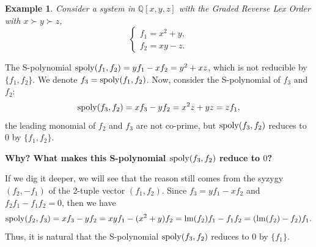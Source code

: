 \documentclass[preprint,authoryear,3p,12pt]{elsarticle}
\newtheorem{example}[theorem]{Example}
\def\lm{{\rm lm}}
\def\lpp{{\rm lpp}}
\def\sp{{\rm spoly}}
\def\Q{{\mathbb{Q}}}
\newcommand{\ignore}[1]{}
\begin{document}
\ignore{
\begin{example} \label{exa-buchbergersyzygy}
Consider a system in $\Q[x, y]$ with the Graded Reverse Lex Order with $x\succ y$:
$$\left\{\begin{array}{l} f_1=x^2-y, \\
f_2=y^2-x.
\end{array}\right. $$
\end{example}
The S-polynomial $\sp(f_1, f_2)=y^2f_1-x^2f_2$ is not necessary to
reduce according to the Buchberger's criterion \citep{Buchberger79},
since the leading power products $\lpp(f_1)=x^2$ and $\lpp(f_2)=y^2$
are co-prime.

However, this fact can also be explained in a slightly different way. For  a   2-tuple vector $(f_1, f_2)$ in $\Q[x, y]^2$, there
exists a trivial syzygy $(f_2, -f_1)$, i.e.   $f_2f_1-f_1f_2=0$  or
$$\lm(f_2)f_1-\lm(f_1)f_2=(\lm(f_2)-f_2)f_1-(\lm(f_1)-f_1)f_2,$$ specifically,
$$\sp(f_1, f_2)=y^2f_1-x^2f_2=xf_1-yf_2,$$ which indicates the S-polynomial
$\sp(f_1, f_2)$ reduces to $0$ by $\{f_1, f_2\}$. The highlight of this explanation is that {\it it is the syzygy of $(f_1, f_2)$
that leads to   $\sp(f_1, f_2)$ reducing to $0$.}

In fact, the syzygy of $(f_1, f_2)$ can also result in some S-polynomials reducing to $0$ even if $\lpp(f_1)$ and $\lpp(f_2)$ are
not co-prime.

Now, let's take a look on the following example:}
\begin{example} \label{exa-syzygy}
Consider a system in $\Q[x, y, z]$ with the Graded Reverse Lex Order with $x\succ y\succ z$,
$$\left\{\begin{array}{l} f_1=x^2+y, \\
f_2=xy-z.
\end{array}\right. $$
\end{example}

The S-polynomial $\sp(f_1, f_2)=yf_1-xf_2=y^2+xz$, which is not reducible by $\{f_1, f_2\}$. We denote $f_3=\sp(f_1, f_2) $. Now,
consider the S-polynomial of $f_3$ and $f_2$: $$\sp(f_3, f_2)=xf_3-yf_2=x^2z+yz=zf_1,$$ the leading monomial of $f_2$ and $f_3$
are not co-prime, but   $\sp(f_3, f_2)$ reduces to $0$ by $\{f_1, f_2\}$.

{\bf Why? What makes this S-polynomial $\sp(f_3, f_2)$ reduce to $0$?}

If we dig it deeper, we will see that the reason still comes from
the syzygy $(f_2, -f_1)$ of the 2-tuple vector $(f_1, f_2)$. Since
$f_3=yf_1-xf_2$ and $f_2f_1-f_1f_2=0$, then we have
$$\sp(f_2,f_3)=xf_3-yf_2=xyf_1-(x^2+y)f_2=\lm(f_2)f_1-f_1f_2=(\lm(f_2)-f_2)f_1.$$
Thus, it is natural that the S-polynomial $\sp(f_3, f_2)$ reduces to $0$ by $\{f_1\}$.
\end{document}
